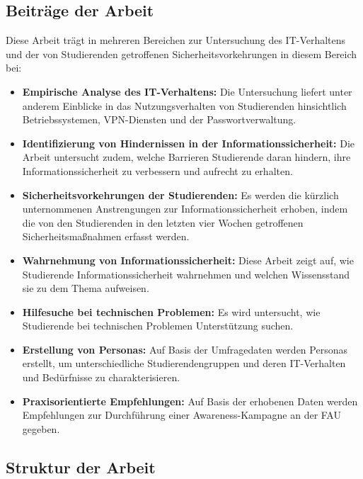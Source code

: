 \documentclass[german,report]{i1thesis}
\begin{document}
\subsection{Beiträge der Arbeit}

Diese Arbeit trägt in mehreren Bereichen zur Untersuchung des IT-Verhaltens und der von Studierenden getroffenen Sicherheitsvorkehrungen in diesem Bereich bei:

\begin{itemize}
    \item \textbf{Empirische Analyse des IT-Verhaltens:} Die Untersuchung liefert unter anderem Einblicke in das Nutzungsverhalten von Studierenden hinsichtlich Betriebssystemen, VPN-Diensten und der Passwortverwaltung.
    
    \item \textbf{Identifizierung von Hindernissen in der Informationssicherheit:} Die Arbeit untersucht zudem, welche Barrieren Studierende daran hindern, ihre Informationssicherheit zu verbessern und aufrecht zu erhalten.
    
    \item \textbf{Sicherheitsvorkehrungen der Studierenden:} Es werden die kürzlich unternommenen Anstrengungen zur Informationssicherheit erhoben, indem die von den Studierenden in den letzten vier Wochen getroffenen Sicherheitsmaßnahmen erfasst werden.
    
    \item \textbf{Wahrnehmung von Informationssicherheit:} Diese Arbeit zeigt auf, wie Studierende Informationssicherheit wahrnehmen und welchen Wissensstand sie zu dem Thema aufweisen.
    
    \item \textbf{Hilfesuche bei technischen Problemen:} Es wird untersucht, wie Studierende bei technischen Problemen Unterstützung suchen.
    
    \item \textbf{Erstellung von Personas:} Auf Basis der Umfragedaten werden Personas erstellt, um unterschiedliche Studierendengruppen und deren IT-Verhalten und Bedürfnisse zu charakterisieren.
    
    \item \textbf{Praxisorientierte Empfehlungen:} Auf Basis der erhobenen Daten werden Empfehlungen zur Durchführung einer Awareness-Kampagne an der FAU gegeben.
\end{itemize}

\subsection{Struktur der Arbeit}
\label{sec:outline}
\end{document}
